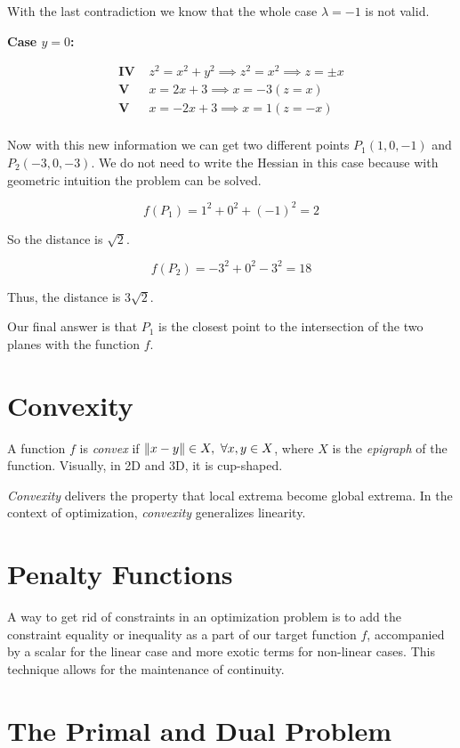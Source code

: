 With the last contradiction we know that the whole case \(\lambda = -1\) is not valid.

\textbf{Case \(y = 0\):}

\begin{align*}
    \textbf{IV  } &z^2 = x^2 + y^2 \implies z^2 = x^2  \implies z = \pm x\\
    \textbf{V   } &x = 2x + 3  \implies x = -3 (z = x)\\ 
    \textbf{V   } &x = -2x + 3  \implies x = 1 (z = -x)\\ 
\end{align*}

Now with this new information we can get two different points \(P_1(1, 0, -1)\) and \(P_2(-3, 0, -3)\).
We do not need to write the Hessian in this case because with geometric intuition the problem can be 
solved.

\[
    f(P_1) = 1^2 + 0^2 + (-1)^2 = 2 
\]

So the distance is \(\sqrt{2}\).

\[
    f(P_2) = -3^2 + 0^2 -3^2 = 18
\]

Thus, the distance is \(3\sqrt{2}\).

Our final answer is that \(P_1\) is the closest point to the intersection of the two planes with the 
function \(f\).

\section{Convexity}

A function \(f\) is \emph{convex} if \(\metric{x - y} \in X, \ \forall x, y \in X\), where \(X\) is the \emph{epigraph} of the function. Visually, 
in 2D and 3D, it is cup-shaped. 

\emph{Convexity} delivers the property that local extrema become global extrema. In the context of optimization, \emph{convexity} generalizes 
linearity.

\section{Penalty Functions}

A way to get rid of constraints in an optimization problem is to add the constraint equality or inequality as a part of our target 
function \(f\), accompanied by a scalar for the linear case and more exotic terms for non-linear cases. This technique allows for the maintenance 
of continuity.

\section{The Primal and Dual Problem}

